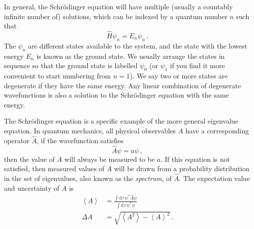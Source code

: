 \documentclass{article}
\theoremstyle{plain}\theoremheaderfont{\normalfont\itshape}\theorembodyfont{\rmfamily}\theoremseparator{.}\newtheorem*{rem}{Remark}\newtheorem*{ex}{Example}\newtheorem*{proof}{Proof}\newtheorem*{altp}{Alternative proof}
\theoremstyle{plain}\theoremheaderfont{\normalfont\bfseries}\theorembodyfont{\rmfamily}\theoremseparator{.}\newtheorem{thm}{Theorem}[section]\newtheorem{lem}[thm]{Lemma}\newtheorem{prop}[thm]{Proposition}\newtheorem*{cor}{Corollary}\newtheorem{defn}[thm]{Definition}\newtheorem{clm}[thm]{Claim}\newtheorem{clminproof}{Claim}
\theoremstyle{break}\theoremheaderfont{\normalfont\itshape}\theorembodyfont{\rmfamily}\theoremseparator{.\medskip}\newtheorem*{proofskip}{Proof}\newtheorem*{exs}{Examples}\newtheorem*{rems}{Remarks}
\theoremstyle{break}\theoremheaderfont{\normalfont\bfseries}\theorembodyfont{\rmfamily}\theoremseparator{.\medskip}\newtheorem{lemskip}[thm]{Lemma}\newtheorem{defnskip}[thm]{Definition}\newtheorem{propskip}[thm]{Proposition}\newtheorem{thmskip}[thm]{Theorem}
\numberwithin{equation}{section}
\newcommand{\dd}[2][]{\mathrm{d}^{#1} #2\,}
\newcommand{\eval}[1]{\left\langle #1 \right\rangle}
\begin{document}
    In general, the Schr\"{o}dinger equation will have multiple (usually a countably infinite number of) solutions, which can be indexed by a quantum number \(n\) such that
    \begin{equation}
        \hat{H}\psi_n=E_n\psi_n\,.
    \end{equation}
    The \(\psi_n\) are different states available to the system, and the state with the lowest energy \(E_n\) is known as the ground state. We usually arrange the states in sequence so that the ground state is labelled \(\psi_0\) (or \(\psi_1\) if you find it more convenient to start numbering from \(n=1\)). We say two or more states are degenerate if they have the same energy. Any linear combination of degenerate wavefunctions is also a solution to the Schr\"{o}dinger equation with the same energy.

    The Schr\"{o}dinger equation is a specific example of the more general eigenvalue equation. In quantum mechanics, all physical observables \(A\) have a corresponding operator \(\hat{A}\), if the wavefunction satisfies
    \begin{equation}
        \hat{A}\psi=a\psi\,,
    \end{equation}
    then the value of \(A\) will always be measured to be \(a\). If this equation is not satisfied, then measured values of \(A\) will be drawn from a probability distribution in the set of eigenvalues, also known as the \textit{spectrum}, of \(\hat{A}\). The expectation value and uncertainty of \(A\) is
    \begin{align}
        \eval{A}&=\frac{\int\dd{\tau}\psi^*\hat{A}\psi}{\int\dd{\tau}\psi^*\psi}\\
        \Delta A&=\sqrt{\eval{A^2}-\eval{A}^2}\,.
    \end{align}
\end{document}
